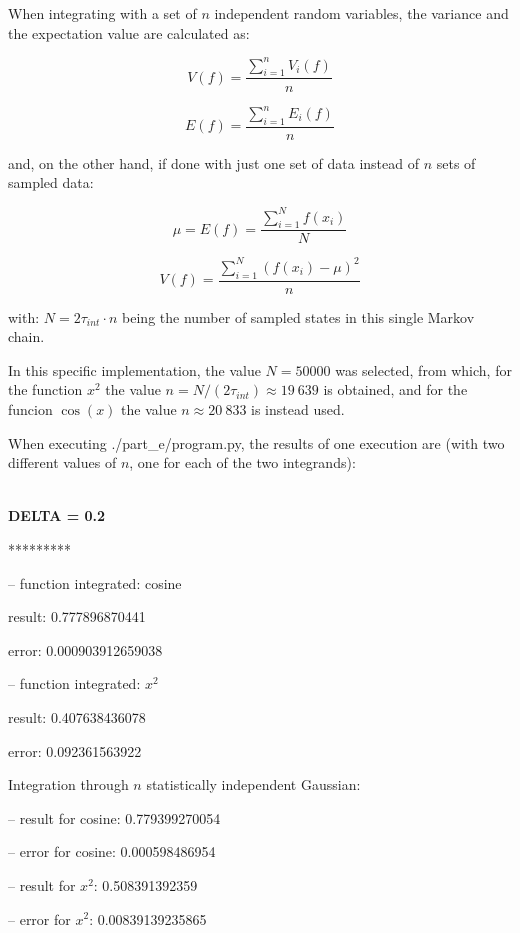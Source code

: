\documentclass[paper=a4, fontsize=11pt]{scrartcl} %
\numberwithin{equation}{section} %
\numberwithin{figure}{section} %
\numberwithin{table}{section} %
\begin{document}
When integrating with a set of $n$ independent random variables, the variance and the expectation value are calculated as:

\begin{equation}
V(f) = \frac{\sum_{i=1}^{n}V_{i}(f)}{n}
\end{equation}

\begin{equation}
E(f) = \frac{\sum_{i=1}^{n}E_{i}(f)}{n}
\end{equation}


and, on the other hand, if done with just one set of data instead of $n$ sets of sampled data:


\begin{equation}
\mu = E(f) = \frac{\sum_{i=1}^{N}f(x_{i})}{N}
\end{equation}

\begin{equation}
V(f) = \frac{\sum_{i=1}^{N}(f(x_{i})-\mu)^{2}}{n}
\end{equation}

with: $N = 2\tau_{int}\cdot n$ being the number of sampled states in this single Markov chain.


In this specific implementation, the value $N = 50 000$ was selected, from which, for the function $x^{2}$ the value $n = N/(2\tau_{int}) \approx 19 \ 639 $ is obtained, and for the funcion $\cos(x)$ the value $n \approx 20 \ 833 $ is instead used.

When executing ./part\_e/program.py, the results of one execution are (with two different values of $n$, one for each of the two integrands):

\ \\

\textbf{DELTA = 0.2}

*********

 -- function integrated: cosine

	result: 0.777896870441

	error: 0.000903912659038

 -- function integrated: $x^2$

	result: 0.407638436078

	error: 0.092361563922


Integration through $n$ statistically independent Gaussian:

 -- result for cosine: 0.779399270054

 -- error for cosine: 0.000598486954

 -- result for $x^2$: 0.508391392359

 -- error for $x^2$: 0.00839139235865

\ \\
\end{document}
